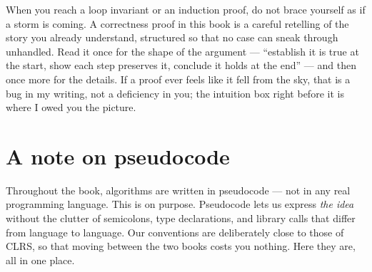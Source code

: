 When you reach a loop invariant or an induction proof, do not brace yourself as if a
storm is coming. A correctness proof in this book is a careful retelling of
the story you already understand, structured so that no case can sneak through
unhandled. Read it once for the shape of the argument --- ``establish it is true at
the start, show each step preserves it, conclude it holds at the end'' --- and then
once more for the details. If a proof ever feels like it fell from the sky, that is
a bug in my writing, not a deficiency in you; the intuition box right before it is
where I owed you the picture.

\section*{A note on pseudocode}

Throughout the book, algorithms are written in pseudocode --- not in any real
programming language. This is on purpose. Pseudocode lets us express \emph{the
idea} without the clutter of semicolons, type declarations, and library calls that
differ from language to language. Our conventions are deliberately close to those
of CLRS, so that moving between the two books costs you nothing. Here they are, all
in one place.


